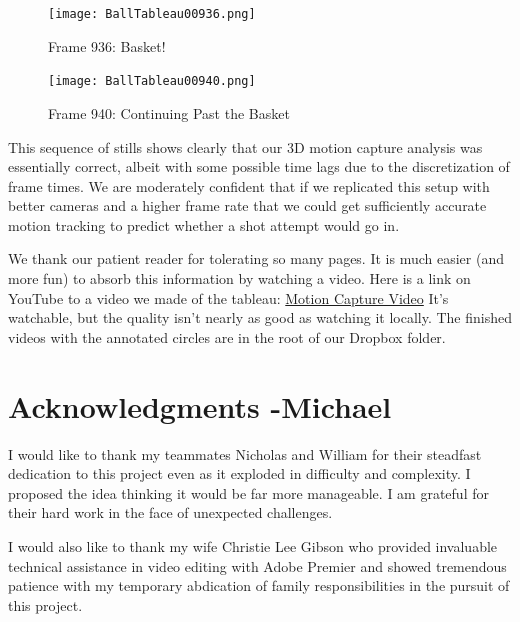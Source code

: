\documentclass{article}
\begin{document}
\begin{figure}[H]
\center
\texttt{[image: BallTableau00936.png]}
\caption*{Frame 936: Basket!}
\end{figure}

\begin{figure}[H]
\center
\texttt{[image: BallTableau00940.png]}
\caption*{Frame 940: Continuing Past the Basket}
\end{figure}

This sequence of stills shows clearly that our 3D motion capture analysis was essentially correct,
albeit with some possible time lags due to the discretization of frame times.
We are moderately confident that if we replicated this setup with better cameras and a higher frame
rate that we could get sufficiently accurate motion tracking to predict whether 
a shot attempt would go in.

We thank our patient reader for tolerating so many pages.  
It is much easier (and more fun) to absorb this information by watching a video.
Here is a link on YouTube to a video we made of the tableau:
\href{https://www.youtube.com/watch?v=RI8qft0qE50&feature=youtu.be}{Motion Capture Video}
It's watchable, but the quality isn't nearly as good as watching it locally.
The finished videos with the annotated circles are in the root of our Dropbox folder.

\newpage
\section{Acknowledgments -Michael}
I would like to thank my teammates Nicholas and William for their steadfast dedication 
to this project even as it exploded in difficulty and complexity. 
I proposed the idea thinking it would be far more manageable.
I am grateful for their hard work in the face of unexpected challenges.

I would also like to thank my wife Christie Lee Gibson who provided invaluable technical assistance
in video editing with Adobe Premier and showed tremendous patience with my temporary abdication
of family responsibilities in the pursuit of this project.
\end{document}
